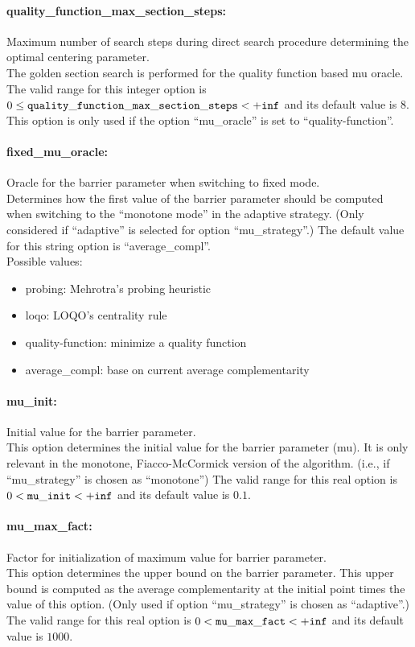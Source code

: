 \paragraph{quality\_function\_max\_section\_steps:} Maximum number of search steps during direct search procedure determining the optimal centering parameter. $\;$ \\
 The golden section search is performed for the
quality function based mu oracle. The valid range for this integer option is
$0 \le {\tt quality\_function\_max\_section\_steps } <  {\tt +inf}$
and its default value is $8$.
This option is only used if the option ``mu\_oracle'' is set to ``quality-function''.


\paragraph{fixed\_mu\_oracle:} Oracle for the barrier parameter when switching to fixed mode. $\;$ \\
 Determines how the first value of the barrier
parameter should be computed when switching to
the ``monotone mode'' in the adaptive strategy.
(Only considered if ``adaptive'' is selected for
option ``mu\_strategy''.)
The default value for this string option is ``average\_compl''.
\\ 
Possible values:
\begin{itemize}
   \item probing: Mehrotra's probing heuristic
   \item loqo: LOQO's centrality rule
   \item quality-function: minimize a quality function
   \item average\_compl: base on current average complementarity
\end{itemize}

\paragraph{mu\_init:} Initial value for the barrier parameter. $\;$ \\
 This option determines the initial value for the
barrier parameter (mu).  It is only relevant in
the monotone, Fiacco-McCormick version of the
algorithm. (i.e., if ``mu\_strategy'' is chosen as
``monotone'') The valid range for this real option is 
$0 <  {\tt mu\_init } <  {\tt +inf}$
and its default value is $0.1$.

\paragraph{mu\_max\_fact:} Factor for initialization of maximum value for barrier parameter. $\;$ \\
 This option determines the upper bound on the
barrier parameter.  This upper bound is computed
as the average complementarity at the initial
point times the value of this option. (Only used
if option ``mu\_strategy'' is chosen as ``adaptive''.) The valid range for this real option is 
$0 <  {\tt mu\_max\_fact } <  {\tt +inf}$
and its default value is $1000$.


